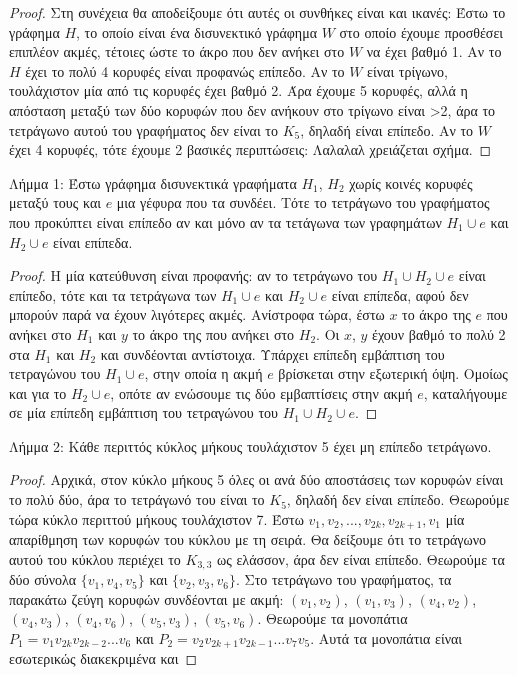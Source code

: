 \documentclass[a4paper, oneside, 11pt]{article}
\theoremstyle{definition}
\begin{document}
\begin{enumerate}
\begin{proof}
Στη συνέχεια θα αποδείξουμε ότι αυτές οι συνθήκες είναι και ικανές: Έστω το γράφημα $H$, το οποίο είναι ένα δισυνεκτικό γράφημα $W$ στο οποίο έχουμε προσθέσει επιπλέον ακμές, τέτοιες ώστε το άκρο που
δεν ανήκει στο $W$ να έχει βαθμό 1. Αν το $H$ έχει το πολύ 4 κορυφές είναι προφανώς επίπεδο. Αν το $W$ είναι τρίγωνο, τουλάχιστον μία από τις κορυφές έχει βαθμό 2. Άρα έχουμε 5 κορυφές, αλλά η απόσταση 
μεταξύ των δύο κορυφών που δεν ανήκουν στο τρίγωνο είναι >2, άρα το τετράγωνο αυτού του γραφήματος δεν είναι το $K_5$, δηλαδή είναι επίπεδο. Αν το $W$ έχει 4 κορυφές, τότε έχουμε 2 βασικές περιπτώσεις:
Λαλαλαλ χρειάζεται σχήμα.

	\end{proof}

Λήμμα 1: Έστω γράφημα δισυνεκτικά γραφήματα $H_1$, $H_2$ χωρίς κοινές κορυφές μεταξύ τους και $e$ μια γέφυρα που τα συνδέει. Τότε το τετράγωνο του γραφήματος που προκύπτει είναι επίπεδο αν και
μόνο αν τα τετάγωνα των γραφημάτων $H_1 \cup e$ και $H_2 \cup e$ είναι επίπεδα.
	\begin{proof}
Η μία κατεύθυνση είναι προφανής: αν το τετράγωνο του $H_1\cup H_2\cup e$ είναι επίπεδο, τότε και τα τετράγωνα των $H_1\cup e$ και $H_2\cup e$ είναι επίπεδα, αφού δεν μπορούν παρά να έχουν λιγότερες ακμές.
Ανίστροφα τώρα, έστω $x$ το άκρο της $e$ που ανήκει στο $H_1$ και $y$ το άκρο της που ανήκει στο $H_2$. Οι $x$, $y$ έχουν βαθμό το πολύ 2 στα $H_1$ και $H_2$ και συνδέονται αντίστοιχα. 
Υπάρχει επίπεδη εμβάπτιση του τετραγώνου του $H_1\cup e$, στην οποία η ακμή $e$ βρίσκεται στην εξωτερική όψη. Ομοίως και για το $H_2\cup e$, οπότε αν ενώσουμε τις δύο εμβαπτίσεις στην ακμή $e$,
καταλήγουμε σε μία επίπεδη εμβάπτιση του τετραγώνου του $H_1\cup H_2\cup e$.
	\end{proof}
Λήμμα 2: Κάθε περιττός κύκλος μήκους τουλάχιστον 5 έχει μη επίπεδο τετράγωνο.
	\begin{proof}
Αρχικά, στον κύκλο μήκους 5 όλες οι ανά δύο αποστάσεις των κορυφών είναι το πολύ δύο, άρα το τετράγωνό του είναι το $K_5$, δηλαδή δεν είναι επίπεδο. Θεωρούμε τώρα κύκλο περιττού μήκους τουλάχιστον 7.
Έστω $v_1, v_2, ..., v_{2k}, v_{2k+1}, v_1$ μία απαρίθμηση των κορυφών του κύκλου με τη σειρά. Θα δείξουμε ότι το τετράγωνο αυτού του κύκλου περιέχει το $K_{3,3}$ ως ελάσσον,
άρα δεν είναι επίπεδο. Θεωρούμε τα δύο σύνολα $\{v_1,v_4,v_5\}$ και $\{v_2,v_3,v_6\}$. Στο τετράγωνο του γραφήματος, τα παρακάτω ζεύγη κορυφών συνδέονται με ακμή: $(v_1, v_2)$, $(v_1,v_3)$, $(v_4,v_2)$,
$(v_4,v_3)$, $(v_4,v_6)$, $(v_5,v_3)$, $(v_5,v_6)$. Θεωρούμε τα μονοπάτια $P_1=v_1 v_{2k} v_{2k-2} ... v_6$ και $P_2=v_2 v_{2k+1} v_{2k-1} ... v_7 v_5$. Αυτά τα μονοπάτια είναι εσωτερικώς διακεκριμένα και 

\end{proof}
\end{enumerate}
\end{document}
